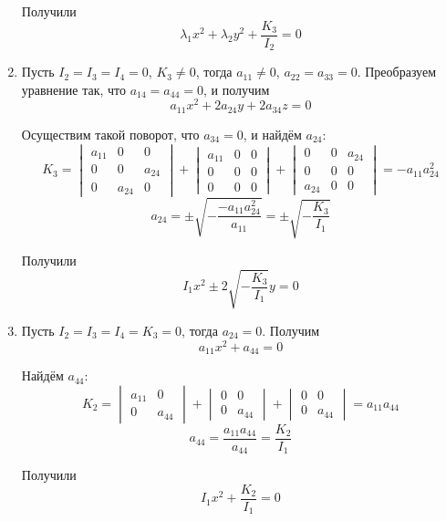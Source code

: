 \begin{enumerate}
	Получили
	\begin{equation*}
	\lambda_1 x^2 + \lambda_2 y^2 + \frac{K_3}{I_2} = 0
	\end{equation*}
	
	\item Пусть $I_2 = I_3 = I_4 = 0$, $K_3 \neq 0$, тогда $a_{11} \neq 0$, $a_{22} = a_{33} = 0$.
	Преобразуем уравнение так, что $a_{14} = a_{44} = 0$, и получим
	\begin{equation*}
	a_{11} x^2 + 2 a_{24} y + 2 a_{34} z = 0
	\end{equation*}
	
	Осуществим такой поворот, что $a_{34} = 0$, и найдём $a_{24}$:
	\begin{equation*}
	K_3 =
	\begin{vmatrix}
	a_{11} & 0 & 0 \\
	0 & 0 & a_{24} \\
	0 & a_{24} & 0
	\end{vmatrix} +
	\begin{vmatrix}
	a_{11} & 0 & 0 \\
	0 & 0 & 0 \\
	0 & 0 & 0
	\end{vmatrix} +
	\begin{vmatrix}
	0 & 0 & a_{24} \\
	0 & 0 & 0 \\
	a_{24} & 0 & 0
	\end{vmatrix} = -a_{11} a_{24}^2
	\end{equation*}
	\begin{equation*}
	a_{24} = \pm\sqrt{-\frac{-a_{11} a_{24}^2}{a_{11}}} = \pm\sqrt{-\frac{K_3}{I_1}}
	\end{equation*}
	
	Получили
	\begin{equation*}
	I_1 x^2 \pm 2\sqrt{-\frac{K_3}{I_1}} y = 0
	\end{equation*}
	
	\item Пусть $I_2 = I_3 = I_4 = K_3 = 0$, тогда $a_{24} = 0$.
	Получим
	\begin{equation*}
	a_{11} x^2 + a_{44} = 0
	\end{equation*}
	
	Найдём $a_{44}$:
	\begin{equation*}
	K_2 =
	\begin{vmatrix}
	a_{11} & 0 \\
	0 & a_{44}
	\end{vmatrix} +
	\begin{vmatrix}
	0 & 0 \\
	0 & a_{44}
	\end{vmatrix} +
	\begin{vmatrix}
	0 & 0 \\
	0 & a_{44}
	\end{vmatrix} = a_{11} a_{44}
	\end{equation*}
	\begin{equation*}
	a_{44} = \frac{a_{11} a_{44}}{a_{44}} = \frac{K_2}{I_1}
	\end{equation*}
	
	Получили
	\begin{equation*}
	I_1 x^2 + \frac{K_2}{I_1} = 0
	\end{equation*}
\end{enumerate}